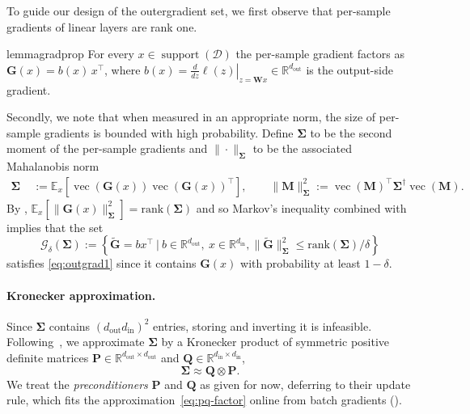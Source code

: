 \documentclass{article}
\DeclareMathOperator{\support}{support}
\renewcommand{\vec}{\operatorname{vec}}
\newcommand{\mat}[1]{\bm{#1}}
\newcommand{\cD}{\mathcal{D}}
\newcommand{\R}{\mathbb{R}}
\newcommand{\EE}[2]{\mathbb{E}_{#1}\left[#2\right] }
\begin{document}
To guide our design of the outergradient set, we first observe that per-sample gradients of linear layers are rank one.
\begin{restatable}{lemma}{gradprop}
  \label{lem:gradprop}
    For every $x \in \support(\cD)$ the per-sample gradient factors as
    $\mat{G}(x) = b(x)\, x^\top$, where
    $b(x) = \left.\tfrac{d}{dz}\ell(z)\right|_{z=\mat{W}x} \in \R^{d_{\mathrm{out}}}$
    is the output-side gradient.
\end{restatable}
Secondly, we note that when measured in an appropriate norm, the size of per-sample gradients is bounded with high probability. Define $\mat{\Sigma}$ to be the second moment of the per-sample gradients and $\|\cdot\|_{\mat{\Sigma}}$ to be the associated Mahalanobis norm
\begin{align}
    \mat{\Sigma} \;&:=\EE{x}{\vec(\mat{G}(x))\vec(\mat{G}(x))^\top}, \qquad 
    \| \mat{M} \|_{\mat{\Sigma}}^2
    := \vec(\mat{M})^\top \mat{\Sigma}^\dagger \vec(\mat{M}).  \label{eq:leverage-score}
\end{align}
By ,
$\EE{x}{\|\mat{G}(x)\|_{\mat{\Sigma}}^2}
=\mathrm{rank}(\mat{\Sigma})$ and so Markov's inequality combined with  implies that the set
\begin{equation}
\label{eq:outgrad-precon}
\mathcal{G}_\delta(\mat{\Sigma}) := \left \{ \widetilde{\mat{G}} = b x^\top ~\bigg |~
b\in\mathbb{R}^{d_{\mathrm{out}}},
    \ x\in\mathbb{R}^{d_{\mathrm{in}}},  \| \widetilde{\mat{G}} \|_{\mat{\Sigma}}^2 \leq \mathrm{rank}(\mat{\Sigma}) / \delta  \right \}
\end{equation} 
satisfies \eqref{eq:outgrad1} since it contains $\mat{G}(x)$
with probability at least $1-\delta$.


\paragraph{Kronecker approximation.}
Since $\mat{\Sigma}$ contains $(d_{\mathrm{out}} d_{\mathrm{in}})^2$ entries, storing and inverting it is infeasible. Following~\cite{shampoo,kfac}, we approximate $\mat{\Sigma}$ by a Kronecker product of symmetric positive definite matrices $\mat{P}\in \R^{d_{\mathrm{out}} \times d_{\mathrm{out}}}$ and $\mat{Q} \in\R^{d_{\mathrm{in}} \times d_{\mathrm{in}}}$,
\begin{equation} \label{eq:pq-factor}
     \mat{\Sigma}  \approx \mat{Q} \otimes \mat{P}.
\end{equation}
We treat the \emph{preconditioners} $\mat{P}$ and $\mat{Q}$ as given for now, deferring to  their update rule, which fits the approximation~\eqref{eq:pq-factor} online from batch gradients ().
\end{document}
